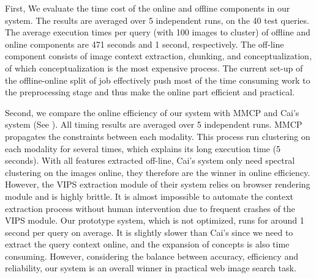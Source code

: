 First, We evaluate the time cost of the online and offline components
in our system. The results are averaged over 5 independent
runs, on the 40 test queries. The average execution times per query
(with 100 images to cluster) of offline and online components are
471 seconds and 1 second, respectively.
The off-line component consists of image context extraction,
chunking, and conceptualization, of which
conceptualization is the most expensive process.
The current set-up of the offline-online split of job effectively push most of
the time consuming work to the preprocessing stage and thus
make the online part efficient and practical.

Second, we compare the online efficiency of our system
with MMCP and Cai's system%
(See ).
All timing results are averaged over 5 independent runs.
MMCP propagates the constraints between each modality. This process run clustering
on each modality for several times, which explains its long execution time (5 seconds).
With all features extracted off-line, Cai's system
only need spectral clustering on the images online,
they therefore are the winner in online efficiency.
However, the VIPS extraction module of their system relies on
browser rendering module and is highly brittle. It is almost impossible to
automate the context extraction process without human intervention due to
frequent crashes of the VIPS module.
Our prototype system, which is not optimized,
runs for around 1 second per query on average.
It is slightly slower than Cai's %
since we need to extract the query context online,
and the expansion of concepts is also time consuming.
However, considering the balance between accuracy, efficiency and reliability,
our system is an overall winner in practical web image search task.

